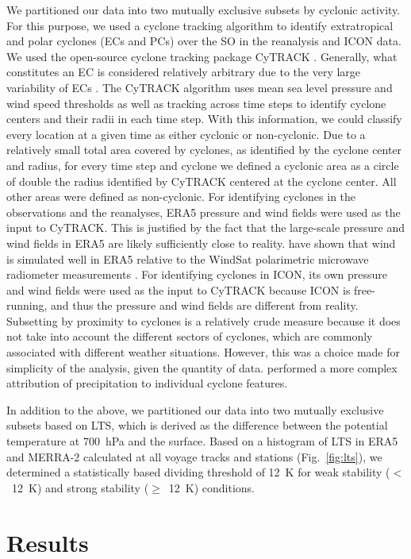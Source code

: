 \documentclass[draft]{agujournal2019}
\begin{document}
We partitioned our data into two mutually exclusive subsets by cyclonic activity. For this purpose, we used a cyclone tracking algorithm to identify extratropical and polar cyclones (ECs and PCs) over the SO in the reanalysis and ICON data. We used the open-source cyclone tracking package CyTRACK \cite{perez-alarcon2024}. Generally, what constitutes an EC is considered relatively arbitrary due to the very large variability of ECs \cite{neu2013}. The CyTRACK algorithm uses mean sea level pressure and wind speed thresholds as well as tracking across time steps to identify cyclone centers and their radii in each time step. With this information, we could classify every location at a given time as either cyclonic or non-cyclonic. Due to a relatively small total area covered by cyclones, as identified by the cyclone center and radius, for every time step and cyclone we defined a cyclonic area as a circle of double the radius identified by CyTRACK centered at the cyclone center. All other areas were defined as non-cyclonic. For identifying cyclones in the observations and the reanalyses, ERA5 pressure and wind fields were used as the input to CyTRACK. This is justified by the fact that the large-scale pressure and wind fields in ERA5 are likely sufficiently close to reality.  have shown that wind is simulated well in ERA5 relative to the WindSat polarimetric microwave radiometer measurements \cite{meissner2009}. For identifying cyclones in ICON, its own pressure and wind fields were used as the input to CyTRACK because ICON is free-running, and thus the pressure and wind fields are different from reality. Subsetting by proximity to cyclones is a relatively crude measure because it does not take into account the different sectors of cyclones, which are commonly associated with different weather situations. However, this was a choice made for simplicity of the analysis, given the quantity of data.  performed a more complex attribution of precipitation to individual cyclone features.

In addition to the above, we partitioned our data into two mutually exclusive subsets based on LTS, which is derived as the difference between the potential temperature at 700~hPa and the surface. Based on a histogram of LTS in ERA5 and MERRA-2 calculated at all voyage tracks and stations (Fig.~\ref{fig:lts}), we determined a statistically based dividing threshold of 12~K for weak stability ($<$~12~K) and strong stability ($\geq$~12~K) conditions.

\section{Results}
\label{sec:results}
\end{document}
